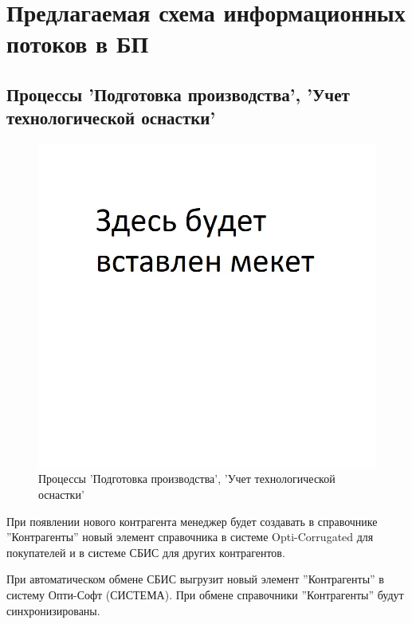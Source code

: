 



%
\newpage
\section{Предлагаемая схема информационных потоков в БП}

\subsection{Процессы 'Подготовка производства', 'Учет технологической оснастки'}
\begin{figure}
\begin{center}
  \includegraphics[angle=90, height=0.9\textheight, keepaspectratio]{Pics/Pattern.jpg}
\end{center}
  \caption{Процессы 'Подготовка производства', 'Учет технологической оснастки'}
  \label{pic:Schema_1}
\end{figure}
\clearpage
При появлении нового контрагента менеджер будет создавать в справочнике ''Контрагенты'' новый элемент справочника в системе Opti-Corrugated для покупателей и в системе СБИС для других контрагентов.


При автоматическом обмене СБИС выгрузит новый элемент ''Контрагенты'' в систему  Опти-Софт (СИСТЕМА). При обмене справочники ''Контрагенты'' будут синхронизированы. 

